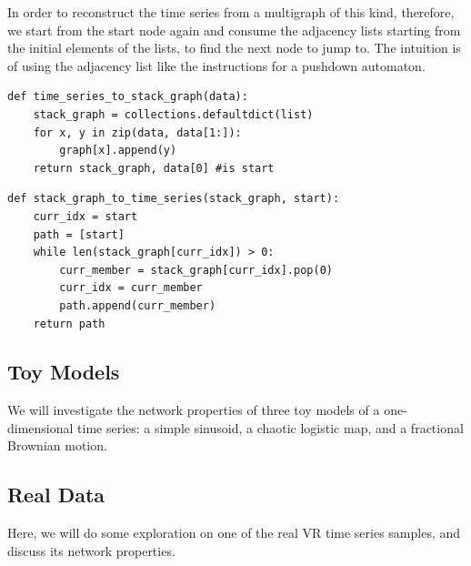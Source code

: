 \documentclass[12pt]{article}
\begin{document}
In order to reconstruct the time series from a multigraph of this kind, therefore, we start from the start node again and consume the adjacency lists starting from the initial elements of the lists, to find the next node to jump to. The intuition is of using the adjacency list like the instructions for a pushdown automaton\cite{pushdown}.


\begin{verbatim}
def time_series_to_stack_graph(data):
    stack_graph = collections.defaultdict(list)
    for x, y in zip(data, data[1:]):
        graph[x].append(y)
    return stack_graph, data[0] #is start
\end{verbatim}

\begin{verbatim}
def stack_graph_to_time_series(stack_graph, start):
    curr_idx = start
    path = [start]
    while len(stack_graph[curr_idx]) > 0:
        curr_member = stack_graph[curr_idx].pop(0)
        curr_idx = curr_member
        path.append(curr_member)
    return path
\end{verbatim}

\subsection{Toy Models}

We will investigate the network properties of three toy models of a one-dimensional time series: a simple sinusoid, a chaotic logistic map, and a fractional Brownian motion.




\subsection{Real Data}

Here, we will do some exploration on one of the real VR time series samples, and discuss its network properties.


\end{document}
